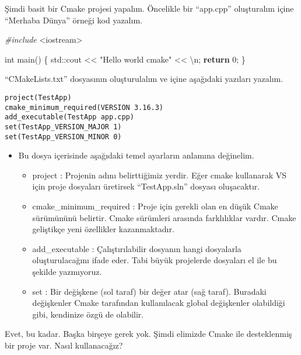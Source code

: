 \documentclass[
]{book}
\newenvironment{Shaded}{\begin{snugshade}}{\end{snugshade}}
\newcommand{\BuiltInTok}[1]{#1}
\newcommand{\CharTok}[1]{\textcolor[rgb]{0.31,0.60,0.02}{#1}}
\newcommand{\ControlFlowTok}[1]{\textcolor[rgb]{0.13,0.29,0.53}{\textbf{#1}}}
\newcommand{\DataTypeTok}[1]{\textcolor[rgb]{0.13,0.29,0.53}{#1}}
\newcommand{\DecValTok}[1]{\textcolor[rgb]{0.00,0.00,0.81}{#1}}
\newcommand{\ImportTok}[1]{#1}
\newcommand{\NormalTok}[1]{#1}
\newcommand{\PreprocessorTok}[1]{\textcolor[rgb]{0.56,0.35,0.01}{\textit{#1}}}
\newcommand{\SpecialCharTok}[1]{\textcolor[rgb]{0.00,0.00,0.00}{#1}}
\newcommand{\StringTok}[1]{\textcolor[rgb]{0.31,0.60,0.02}{#1}}
\providecommand{\tightlist}{%
  \setlength{\itemsep}{0pt}\setlength{\parskip}{0pt}}
\begin{document}
Şimdi basit bir Cmake projesi yapalım. Öncelikle bir ``app.cpp'' oluşturalım içine ``Merhaba Dünya'' örneği kod yazalım.

\begin{Shaded}
\begin{Highlighting}[]
\PreprocessorTok{\#include }\ImportTok{<iostream>}

\DataTypeTok{int}\NormalTok{ main()}
\NormalTok{\{}
  \BuiltInTok{std::}\NormalTok{cout << }\StringTok{"Hello world cmake"}\NormalTok{ << }\CharTok{\textquotesingle{}}\SpecialCharTok{\textbackslash{}n}\CharTok{\textquotesingle{}}\NormalTok{;}
  \ControlFlowTok{return} \DecValTok{0}\NormalTok{;}
\NormalTok{\}}
\end{Highlighting}
\end{Shaded}

``CMakeLists.txt'' dosyasının oluşturulalım ve içine aşağıdaki yazıları yazalım.

\begin{verbatim}
project(TestApp)
cmake_minimum_required(VERSION 3.16.3) 
add_executable(TestApp app.cpp)
set(TestApp_VERSION_MAJOR 1)
set(TestApp_VERSION_MINOR 0)
\end{verbatim}

\begin{itemize}
\tightlist
\item
  Bu dosya içerisinde aşağıdaki temel ayarların anlamına değinelim.

  \begin{itemize}
  \tightlist
  \item
    project : Projenin adını belirttiğimiz yerdir. Eğer cmake kullanarak VS için proje dosyaları üretirsek ``TestApp.sln'' dosyası oluşacaktır.
  \item
    cmake\_minimum\_required : Proje için gerekli olan en düşük Cmake sürümününü belirtir. Cmake sürümleri arasında farklılıklar vardır. Cmake geliştikçe yeni özellikler kazanmaktadır.
  \item
    add\_executable : Çalıştırılabilir dosyanın hangi dosyalarla oluşturulacağını ifade eder. Tabi büyük projelerde dosyaları el ile bu şekilde yazmıyoruz.
  \item
    set : Bir değişkene (sol taraf) bir değer atar (sağ taraf). Buradaki değişkenler Cmake tarafından kullanılacak global değişkenler olabildiği gibi, kendinize özgü de olabilir.
  \end{itemize}
\end{itemize}

Evet, bu kadar. Başka birşeye gerek yok. Şimdi elimizde Cmake ile desteklenmiş bir proje var. Nasıl kullanacağız?
\end{document}
